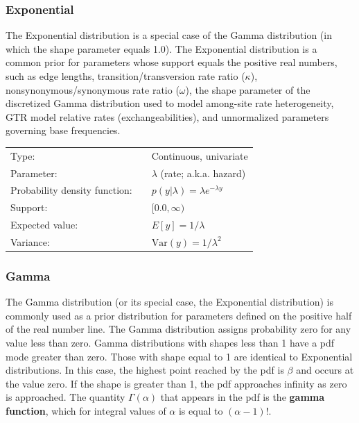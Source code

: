\documentclass[10pt]{article}
\newcommand{\termfirst}[1]{{\bfseries #1}\index{#1}}	%
\newcommand{\Var}{\mbox{Var}}
\begin{document}
\subsubsection{Exponential}

The Exponential distribution is a special case of the Gamma distribution (in which the shape parameter equals 1.0). The Exponential distribution is a common prior for parameters whose support equals the positive real numbers, such as edge lengths, transition/transversion rate ratio ($\kappa$), nonsynonymous/synonymous rate ratio ($\omega$), the shape parameter of the discretized Gamma distribution used to model among-site rate heterogeneity, GTR model relative rates (exchangeabilities), and unnormalized parameters governing base frequencies.

\begin{tabular}{lcl}
Type:                 & & Continuous, univariate \\
Parameter:            & & $\lambda$ (rate; a.k.a. hazard)    \\
Probability density function: & & $p(y|\lambda) = \lambda e^{-\lambda y}$ \\
Support:              & & $[0.0,\infty)$     \\
Expected value:       & & $E[y] = 1/\lambda$ \\
Variance:             & & $\Var(y) = 1/\lambda^2$ 
\end{tabular}

\subsubsection{Gamma}

The Gamma distribution (or its special case, the Exponential distribution) is commonly used as a prior distribution for parameters defined on the positive half of the real number line. The Gamma distribution assigns probability zero for any value less than zero. Gamma distributions with shapes less than 1 have a pdf mode greater than zero. Those with shape equal to 1 are identical to Exponential distributions. In this case, the highest point reached by the pdf is $\beta$ and occurs at the value zero. If the shape is greater than 1, the pdf approaches infinity as zero is approached. The quantity $\Gamma(\alpha)$ that appears in the pdf is the \termfirst{gamma function}, which for integral values of $\alpha$ is equal to $(\alpha-1)!$.
\end{document}
